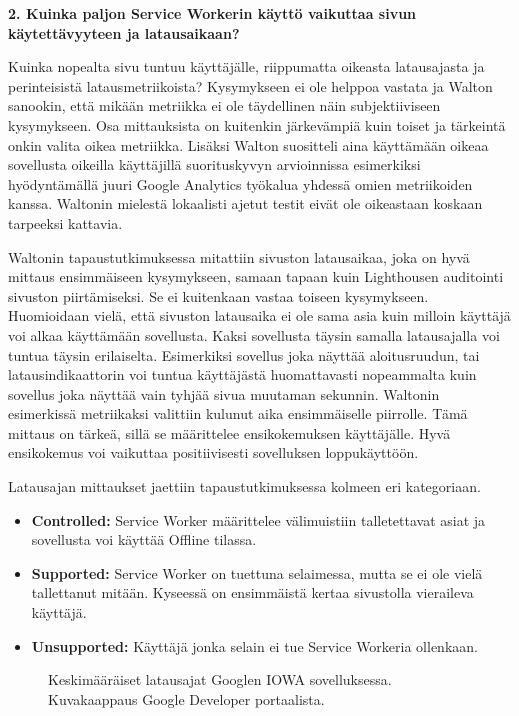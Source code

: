 \documentclass{tktltiki}
\begin{document}
\textbf{2. Kuinka paljon Service Workerin käyttö vaikuttaa sivun käytettävyyteen ja latausaikaan?}

Kuinka nopealta sivu tuntuu käyttäjälle, riippumatta oikeasta latausajasta ja perinteisistä latausmetriikoista? Kysymykseen ei ole helppoa vastata ja Walton \cite{Walton} sanookin, että mikään metriikka ei ole täydellinen näin subjektiiviseen kysymykseen. Osa mittauksista on kuitenkin järkevämpiä kuin toiset ja tärkeintä onkin valita oikea metriikka. Lisäksi Walton suositteli aina käyttämään oikeaa sovellusta oikeilla käyttäjillä suorituskyvyn arvioinnissa esimerkiksi hyödyntämällä juuri Google Analytics työkalua yhdessä omien metriikoiden kanssa. Waltonin mielestä lokaalisti ajetut testit eivät ole oikeastaan koskaan tarpeeksi kattavia.

Waltonin tapaustutkimuksessa \cite{Walton} mitattiin sivuston latausaikaa, joka on hyvä mittaus ensimmäiseen kysymykseen, samaan tapaan kuin Lighthousen auditointi sivuston piirtämiseksi. Se ei kuitenkaan vastaa toiseen kysymykseen. Huomioidaan vielä, että sivuston latausaika ei ole sama asia kuin milloin käyttäjä voi alkaa käyttämään sovellusta. Kaksi sovellusta täysin samalla latausajalla voi tuntua täysin erilaiselta. Esimerkiksi sovellus joka näyttää aloitusruudun, tai latausindikaattorin voi tuntua käyttäjästä huomattavasti nopeammalta kuin sovellus joka näyttää vain tyhjää sivua muutaman sekunnin. Waltonin esimerkissä metriikaksi valittiin kulunut aika ensimmäiselle piirrolle. Tämä mittaus on tärkeä, sillä se määrittelee ensikokemuksen käyttäjälle. Hyvä ensikokemus voi vaikuttaa positiivisesti sovelluksen loppukäyttöön. 

Latausajan mittaukset jaettiin tapaustutkimuksessa kolmeen eri kategoriaan.

\begin{itemize}
  \item \textbf{Controlled:} Service Worker määrittelee välimuistiin talletettavat asiat ja sovellusta voi käyttää Offline tilassa.
  \item \textbf{Supported:} Service Worker on tuettuna selaimessa, mutta se ei ole vielä tallettanut mitään. Kyseessä on ensimmäistä kertaa sivustolla vieraileva käyttäjä.
  \item \textbf{Unsupported:} Käyttäjä jonka selain ei tue Service Workeria ollenkaan. 
\end{itemize}

\begin{figure}[h]
\begin{center}
\caption{Keskimääräiset latausajat Googlen IOWA sovelluksessa. Kuvakaappaus Google Developer portaalista.}
\label{Google AVG load times}
\end{center}
\end{figure}
\end{document}
